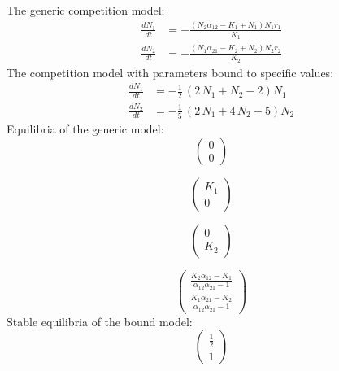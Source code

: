 \documentclass{article}
\begin{document}
The generic competition model:
\[\begin{align*}
\frac{dN_{1}}{dt} &= -\frac{{\left(N_{2} \alpha_{12} - K_{1} + N_{1}\right)} N_{1} r_{1}}{K_{1}}\\
\frac{dN_{2}}{dt} &= -\frac{{\left(N_{1} \alpha_{21} - K_{2} + N_{2}\right)} N_{2} r_{2}}{K_{2}}
\end{align*}\]
The competition model with parameters bound to specific values:
\[\begin{align*}
\frac{dN_{1}}{dt} &= -\frac{1}{2} \, {\left(2 \, N_{1} + N_{2} - 2\right)} N_{1}\\
\frac{dN_{2}}{dt} &= -\frac{1}{5} \, {\left(2 \, N_{1} + 4 \, N_{2} - 5\right)} N_{2}
\end{align*}\]
Equilibria of the generic model: 
\[\left(\begin{array}{c}
  0\\
  0
\end{array}\right)\]

\[\left(\begin{array}{c}
  K_{1}\\
  0
\end{array}\right)\]

\[\left(\begin{array}{c}
  0\\
  K_{2}
\end{array}\right)\]

\[\left(\begin{array}{c}
  \frac{K_{2} \alpha_{12} - K_{1}}{\alpha_{12} \alpha_{21} - 1}\\
  \frac{K_{1} \alpha_{21} - K_{2}}{\alpha_{12} \alpha_{21} - 1}
\end{array}\right)\]
Stable equilibria of the bound model: 
\[\left(\begin{array}{c}
  \frac{1}{2}\\
  1
\end{array}\right)\]
\end{document}
